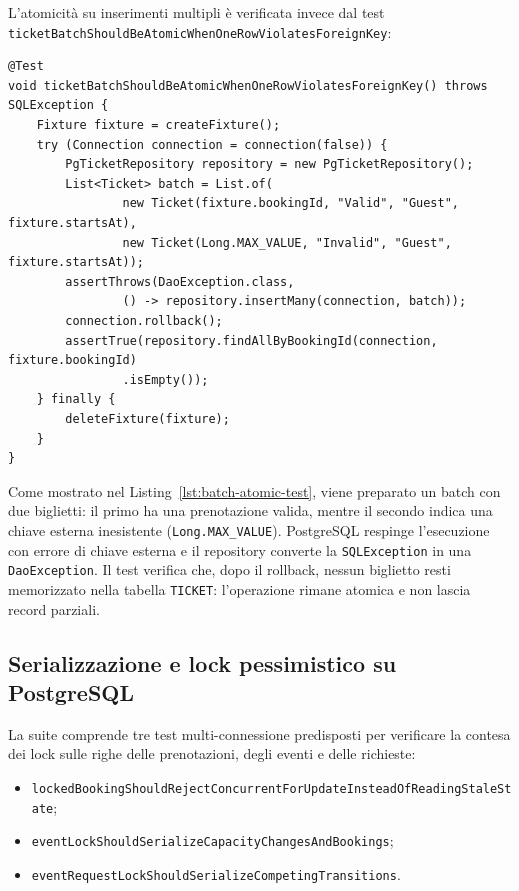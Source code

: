 L'atomicità su inserimenti multipli è verificata invece dal test \texttt{ticket\allowbreak{}Batch\allowbreak{}Should\allowbreak{}Be\allowbreak{}Atomic\allowbreak{}When\allowbreak{}One\allowbreak{}Row\allowbreak{}Violates\allowbreak{}Foreign\allowbreak{}Key}:

\begin{lstlisting}[caption={Test di atomicità dell'inserimento batch con violazione di chiave esterna.}, label={lst:batch-atomic-test}]
@Test
void ticketBatchShouldBeAtomicWhenOneRowViolatesForeignKey() throws SQLException {
    Fixture fixture = createFixture();
    try (Connection connection = connection(false)) {
        PgTicketRepository repository = new PgTicketRepository();
        List<Ticket> batch = List.of(
                new Ticket(fixture.bookingId, "Valid", "Guest", fixture.startsAt),
                new Ticket(Long.MAX_VALUE, "Invalid", "Guest", fixture.startsAt));
        assertThrows(DaoException.class,
                () -> repository.insertMany(connection, batch));
        connection.rollback();
        assertTrue(repository.findAllByBookingId(connection, fixture.bookingId)
                .isEmpty());
    } finally {
        deleteFixture(fixture);
    }
}
\end{lstlisting}

Come mostrato nel Listing~\ref{lst:batch-atomic-test}, viene preparato un batch con due biglietti: il primo ha una prenotazione valida, mentre il secondo indica una chiave esterna inesistente (\texttt{Long.MAX\_VALUE}).
PostgreSQL respinge l'esecuzione con errore di chiave esterna e il repository converte la \texttt{SQLException} in una \texttt{DaoException}.
Il test verifica che, dopo il rollback, nessun biglietto resti memorizzato nella tabella \texttt{TICKET}: l'operazione rimane atomica e non lascia record parziali.

\subsection{Serializzazione e lock pessimistico su PostgreSQL}
\label{sec:lock-pessimistico-postgres}
La suite comprende tre test multi-connessione predisposti per verificare la contesa dei lock sulle righe delle prenotazioni, degli eventi e delle richieste:
\begin{itemize}
  \item \texttt{lockedBookingShouldRejectConcurrent\allowbreak ForUpdateInsteadOfReadingStaleState};
  \item \texttt{eventLockShouldSerialize\allowbreak CapacityChangesAndBookings};
  \item \texttt{eventRequestLockShouldSerialize\allowbreak CompetingTransitions}.
\end{itemize}

